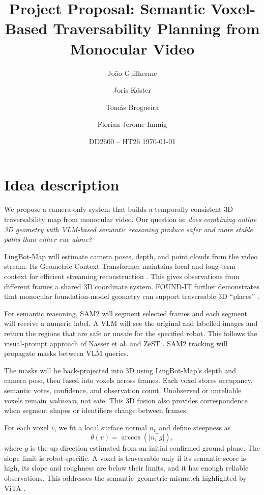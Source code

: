 \documentclass[11pt,a4paper]{article}
\title{\vspace{-1.5cm}\textbf{Project Proposal: Semantic Voxel-Based Traversability Planning from Monocular Video}}
\author{João Guilherme \and Joris Köster \and Tomás Brogueira \and Florian Jerome Immig}
\date{DD2600 -- HT26 \quad \today}
\begin{document}
\maketitle
\vspace{-0.8cm}

\maketitle

\section{Idea description}

We propose a camera-only system that builds a temporally consistent 3D traversability map from monocular video. Our question is: \emph{does combining online 3D geometry with VLM-based semantic reasoning produce safer and more stable paths than either cue alone?}

LingBot-Map will estimate camera poses, depth, and point clouds from the video stream. Its Geometric Context Transformer maintains local and long-term context for efficient streaming reconstruction \cite{chen_geometric_nodate}. This gives observations from different frames a shared 3D coordinate system. FOUND-IT further demonstrates that monocular foundation-model geometry can support traversable 3D ``places'' \cite{maggio_found-it_2026}.

For semantic reasoning, SAM2 will segment selected frames and each segment will receive a numeric label. A VLM will see the original and labelled images and return the regions that are safe or unsafe for the specified robot. This follows the visual-prompt approach of Nasser et al. and ZeST \cite{nasser_visual_2026,gummadi_zest_2025}. SAM2 tracking will propagate masks between VLM queries.

The masks will be back-projected into 3D using LingBot-Map's depth and camera pose, then fused into voxels across frames. Each voxel stores occupancy, semantic votes, confidence, and observation count. Unobserved or unreliable voxels remain \emph{unknown}, not safe. This 3D fusion also provides correspondence when segment shapes or identifiers change between frames.

For each voxel $v$, we fit a local surface normal $n_v$ and define steepness as
\[
    \theta(v)=\arccos\!\left(\lvert n_v^\top g\rvert\right),
\]
where $g$ is the up direction estimated from an initial confirmed ground plane. The slope limit is robot-specific. A voxel is traversable only if its semantic score is high, its slope and roughness are below their limits, and it has enough reliable observations. This addresses the semantic--geometric mismatch highlighted by ViTA \cite{hwang_general_2026}.
\end{document}
